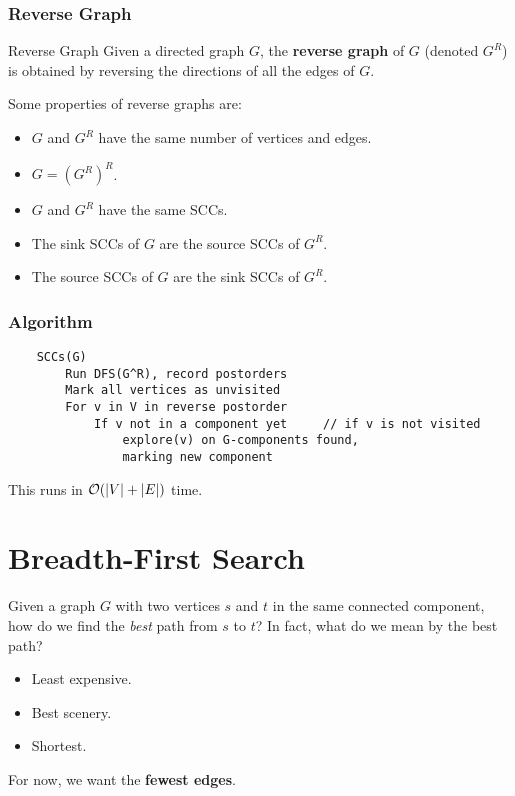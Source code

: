 \documentclass[letterpaper]{article}
\begin{document}
\subsubsection{Reverse Graph}
\begin{definition}{Reverse Graph}{}
    Given a directed graph $G$, the \textbf{reverse graph} of $G$ (denoted $G^R$) is obtained by reversing the directions of all the edges of $G$.
\end{definition}
Some properties of reverse graphs are: 
\begin{itemize}
    \item $G$ and $G^R$ have the same number of vertices and edges. 
    \item $G = (G^R)^R$. 
    \item $G$ and $G^R$ have the same SCCs. 
    \item The sink SCCs of $G$ are the source SCCs of $G^R$. 
    \item The source SCCs of $G$ are the sink SCCs of $G^R$. 
\end{itemize}

\subsubsection{Algorithm}
\begin{verbatim}
    SCCs(G)
        Run DFS(G^R), record postorders
        Mark all vertices as unvisited 
        For v in V in reverse postorder 
            If v not in a component yet     // if v is not visited 
                explore(v) on G-components found,
                marking new component 
\end{verbatim}
This runs in $\mathcal{O}(|V| + |E|)$ time. 



\newpage 
\section{Breadth-First Search}
Given a graph $G$ with two vertices $s$ and $t$ in the same connected component, how do we find the \emph{best} path from $s$ to $t$? In fact, what do we mean by the best path? 
\begin{itemize}
    \item Least expensive. 
    \item Best scenery.
    \item Shortest.
\end{itemize}
For now, we want the \textbf{fewest edges}. 
\end{document}
